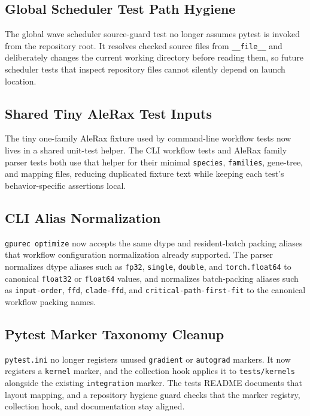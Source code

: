 \documentclass[11pt]{article}
\begin{document}
\subsection{Global Scheduler Test Path Hygiene}

The global wave scheduler source-guard test no longer assumes pytest is invoked
from the repository root.  It resolves checked source files from
\texttt{\_\_file\_\_} and deliberately changes the current working directory
before reading them, so future scheduler tests that inspect repository files
cannot silently depend on launch location.

\subsection{Shared Tiny AleRax Test Inputs}

The tiny one-family AleRax fixture used by command-line workflow tests now
lives in a shared unit-test helper.  The CLI workflow tests and AleRax family
parser tests both use that helper for their minimal \texttt{species},
\texttt{families}, gene-tree, and mapping files, reducing duplicated fixture
text while keeping each test's behavior-specific assertions local.

\subsection{CLI Alias Normalization}

\texttt{gpurec optimize} now accepts the same dtype and resident-batch packing
aliases that workflow configuration normalization already supported.  The
parser normalizes dtype aliases such as \texttt{fp32}, \texttt{single},
\texttt{double}, and \texttt{torch.float64} to canonical \texttt{float32} or
\texttt{float64} values, and normalizes batch-packing aliases such as
\texttt{input-order}, \texttt{ffd}, \texttt{clade-ffd}, and
\texttt{critical-path-first-fit} to the canonical workflow packing names.

\subsection{Pytest Marker Taxonomy Cleanup}

\texttt{pytest.ini} no longer registers unused \texttt{gradient} or
\texttt{autograd} markers.  It now registers a \texttt{kernel} marker, and the
collection hook applies it to \texttt{tests/kernels} alongside the existing
\texttt{integration} marker.  The tests README documents that layout mapping,
and a repository hygiene guard checks that the marker registry, collection hook,
and documentation stay aligned.
\end{document}
